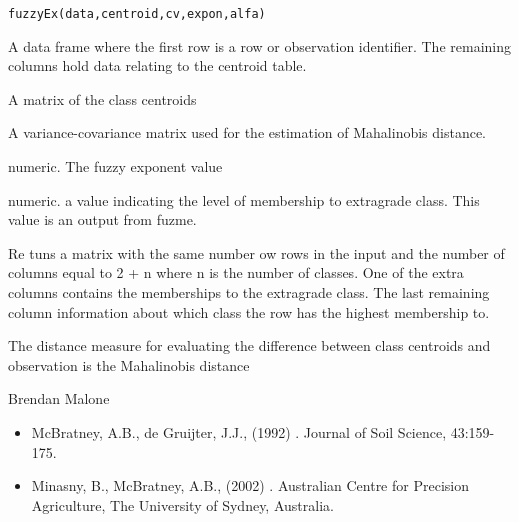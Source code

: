 \documentclass[a4paper]{book}
\begin{document}
%
\begin{Usage}
\begin{verbatim}
fuzzyEx(data,centroid,cv,expon,alfa)
\end{verbatim}
\end{Usage}
%
\begin{Arguments}
\begin{ldescription}
\item[\code{data}] A data frame where the first row is a row or observation identifier. The remaining columns hold data relating to the centroid table.
\item[\code{centroid}] A matrix of the class centroids
\item[\code{cv}] A variance-covariance matrix used for the estimation of Mahalinobis distance.
\item[\code{expon}] numeric. The fuzzy exponent value
\item[\code{alfa}] numeric. a value indicating the level of membership to extragrade class. This value is an output from fuzme.
\end{ldescription}
\end{Arguments}
%
\begin{Value}
Re tuns a matrix with the same number ow rows in the  input and the number of columns equal to 2 + n where n is the number of classes. One of the extra columns contains the memberships to the extragrade class. The last remaining column information about which class the row has the highest membership to.
\end{Value}
%
\begin{Note}
The distance measure for evaluating the difference between class centroids and observation is the Mahalinobis distance
\end{Note}
%
\begin{Author}
Brendan Malone
\end{Author}
%
\begin{References}
\begin{itemize}

\item{} McBratney, A.B., de Gruijter, J.J., (1992) . Journal of Soil Science, 43:159-175.  
\item{} Minasny, B., McBratney, A.B., (2002) . Australian Centre for Precision Agriculture, The University of Sydney, Australia.

\end{itemize}

\end{References}
\end{document}
